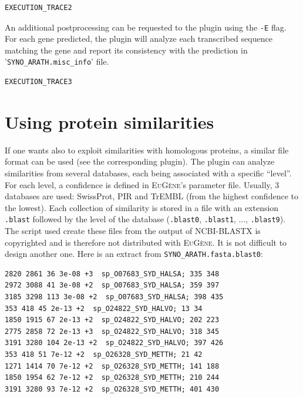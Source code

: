 \documentclass[a4paper,titlepage]{report}
\newcommand{\EuGene}{\textsc{EuG\`ene}}
\begin{document}
\begin{Verbatim}[fontsize=\scriptsize]
EXECUTION_TRACE2
\end{Verbatim}

An additional postprocessing can be requested to the plugin using the
\texttt{-E} flag. For each gene predicted, the plugin will analyze
each transcribed sequence matching the gene and report its consistency
with the prediction in '\texttt{SYNO\_ARATH.misc\_info}' file.

\begin{Verbatim}[fontsize=\scriptsize]
EXECUTION_TRACE3
\end{Verbatim}


\section{Using protein similarities}

If one wants also to exploit similarities with homologous proteins, a
similar file format can be used (see the corresponding plugin). The
plugin can analyze similarities from several databases, each being
associated with a specific ``level''. For each level, a confidence is
defined in \EuGene's parameter file. Usually, 3 databases are used:
SwissProt, PIR and TrEMBL (from the highest confidence to the
lowest). Each collection of similarity is stored in a file with an
extension \texttt{.blast} followed by the level of the database 
(\texttt{.blast0}, \texttt{.blast1}, ..., \texttt{.blast9}).  The
script used create these files from the output of NCBI-BLASTX is
copyrighted and is therefore not distributed with \EuGene. It is not
difficult to design another one. Here is an extract from
\texttt{SYNO\_ARATH.fasta.blast0}:

\begin{Verbatim}[fontsize=\scriptsize]
2820 2861 36 3e-08 +3  sp_O07683_SYD_HALSA; 335 348
2972 3088 41 3e-08 +2  sp_O07683_SYD_HALSA; 359 397
3185 3298 113 3e-08 +2  sp_O07683_SYD_HALSA; 398 435
353 418 45 2e-13 +2  sp_O24822_SYD_HALVO; 13 34
1850 1915 67 2e-13 +2  sp_O24822_SYD_HALVO; 202 223
2775 2858 72 2e-13 +3  sp_O24822_SYD_HALVO; 318 345
3191 3280 104 2e-13 +2  sp_O24822_SYD_HALVO; 397 426
353 418 51 7e-12 +2  sp_O26328_SYD_METTH; 21 42
1271 1414 70 7e-12 +2  sp_O26328_SYD_METTH; 141 188
1850 1954 62 7e-12 +2  sp_O26328_SYD_METTH; 210 244
3191 3280 93 7e-12 +2  sp_O26328_SYD_METTH; 401 430
\end{Verbatim}
\end{document}
